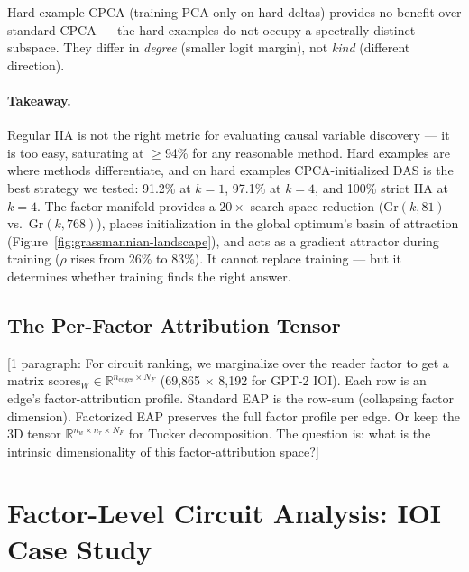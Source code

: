 \documentclass[11pt]{article}
\begin{document}
Hard-example CPCA (training PCA only on hard deltas) provides no
benefit over standard CPCA --- the hard examples do not occupy a
spectrally distinct subspace. They differ in \emph{degree} (smaller
logit margin), not \emph{kind} (different direction).

\paragraph{Takeaway.}
Regular IIA is not the right metric for evaluating causal variable
discovery --- it is too easy, saturating at $\geq$94\% for any
reasonable method. Hard examples are where methods differentiate, and
on hard examples CPCA-initialized DAS is the best strategy we tested:
91.2\% at $k=1$, 97.1\% at $k=4$, and 100\% strict IIA at $k=4$.
The factor manifold provides a $20\times$ search space reduction
($\mathrm{Gr}(k, 81)$ vs.\ $\mathrm{Gr}(k, 768)$), places
initialization in the global optimum's basin of attraction
(Figure~\ref{fig:grassmannian-landscape}), and acts as a gradient
attractor during training ($\rho$ rises from 26\% to 83\%).
It cannot replace training --- but it determines whether training
finds the right answer.

\subsection{The Per-Factor Attribution Tensor}

[1 paragraph: For circuit ranking, we marginalize over the reader
factor to get a matrix $\text{scores}_W \in \mathbb{R}^{n_{\text{edges}}
\times N_F}$ (69,865 $\times$ 8,192 for GPT-2 IOI). Each row is an
edge's factor-attribution profile. Standard EAP is the row-sum
(collapsing factor dimension). Factorized EAP preserves the full
factor profile per edge. Or keep the 3D tensor
$\mathbb{R}^{n_w \times n_r \times N_F}$ for Tucker decomposition.
The question is: what is the intrinsic dimensionality of this
factor-attribution space?]



\section{Factor-Level Circuit Analysis: IOI Case Study}
\label{sec:analysis}
\end{document}
